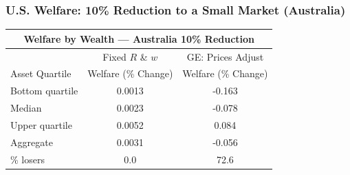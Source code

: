 \documentclass[9pt,pdftex,aspectratio=1610]{beamer}
\theoremstyle{definition}
\begin{document}
\begin{frame}[t]
\frametitle{U.S. Welfare: 10\% Reduction to a Small Market (Australia)}
\begin{table}[t]
\footnotesize
\setlength {\tabcolsep}{6.05mm}
\renewcommand{\arraystretch}{1.80}
\begin{center}
\begin{tabular}{l c c}
\multicolumn{3}{c}{\small \textbf{Welfare by Wealth --- Australia {\color{red} 10\%} Reduction}}\\
\hline
\hline
& \footnotesize  Fixed $R$ \& $w$ & GE: Prices Adjust \\
\cmidrule(lr){2-2}  \cmidrule(lr){3-3}
\footnotesize  Asset Quartile & \footnotesize  Welfare (\% Change) & \footnotesize  Welfare (\% Change) \\
\footnotesize  Bottom quartile  & 0.0013 & -0.163 \\
\footnotesize  Median & 0.0023 & -0.078 \\
\footnotesize  Upper quartile  & 0.0052 & 0.084  \\
\footnotesize  Aggregate & 0.0031 & -0.056  \\
\cmidrule(lr){2-2}  \cmidrule(lr){3-3}
\footnotesize  \% losers & 0.0 & 72.6\\
\hline
\end{tabular}
\end{center}
\end{table}
\end{frame}


\end{document}

